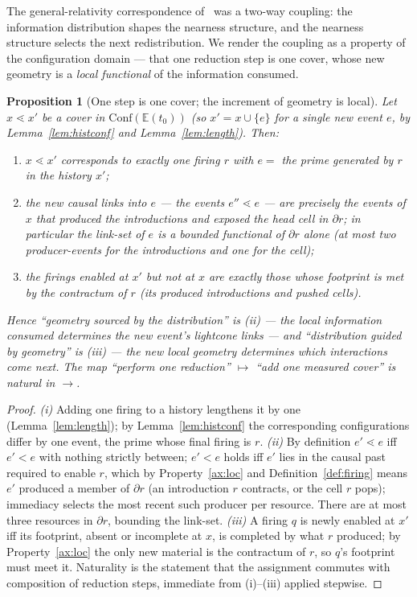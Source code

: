\documentclass[11pt]{article}
\theoremstyle{definition}
\theoremstyle{plain}
\newtheorem{proposition}[definition]{Proposition}
\newcommand{\red}{\longrightarrow}
\newcommand{\foot}{\partial}                       %
\newcommand{\Conf}{\mathrm{Conf}}
\newcommand{\Ev}{\mathbb{E}}
\newcommand{\lc}{\lessdot}                          %
\theoremstyle{remark}
\begin{document}
The general-relativity correspondence of~\cite{CostNote} was a two-way
coupling: the information distribution shapes the nearness structure, and
the nearness structure selects the next redistribution. We render the
coupling as a property of the configuration domain --- that one reduction
step is one cover, whose new geometry is a \emph{local functional} of the
information consumed.

\begin{proposition}[One step is one cover; the increment of geometry is local]
\label{prop:naturality}
Let $x \lc x'$ be a cover in $\Conf(\Ev(t_0))$ (so $x' = x \cup \{e\}$
for a single new event $e$, by Lemma~\ref{lem:histconf} and
Lemma~\ref{lem:length}). Then:
\begin{enumerate}[label=\textup{(\roman*)},leftmargin=2.2em,itemsep=1pt]
  \item $x \lc x'$ corresponds to exactly one firing $r$ with $e = $ the
  prime generated by $r$ in the history $x'$;
  \item the new causal links into $e$ --- the events $e'' \lc e$ ---
  are precisely the events of $x$ that produced the introductions and
  exposed the head cell in $\foot r$; in particular the link-set of $e$
  is a bounded functional of $\foot r$ alone (at most two
  producer-events for the introductions and one for the cell);
  \item the firings enabled at $x'$ but not at $x$ are exactly those
  whose footprint is met by the contractum of $r$ (its produced
  introductions and pushed cells).
\end{enumerate}
Hence ``geometry sourced by the distribution'' is \textup{(ii)} --- the
local information consumed determines the new event's lightcone links ---
and ``distribution guided by geometry'' is \textup{(iii)} --- the new
local geometry determines which interactions come next. The map ``perform
one reduction'' $\mapsto$ ``add one measured cover'' is natural in $\red$.
\end{proposition}

\begin{proof}
\emph{(i)} Adding one firing to a history lengthens it by one
(Lemma~\ref{lem:length}); by Lemma~\ref{lem:histconf} the corresponding
configurations differ by one event, the prime whose final firing is $r$.
\emph{(ii)} By definition $e' \lc e$ iff $e' < e$ with nothing strictly
between; $e' < e$ holds iff $e'$ lies in the causal past required to
enable $r$, which by Property~\ref{ax:loc} and
Definition~\ref{def:firing} means $e'$ produced a member of $\foot r$
(an introduction $r$ contracts, or the cell $r$ pops); immediacy selects
the most recent such producer per resource. There are at most three
resources in $\foot r$, bounding the link-set. \emph{(iii)} A firing $q$
is newly enabled at $x'$ iff its footprint, absent or incomplete at $x$,
is completed by what $r$ produced; by Property~\ref{ax:loc} the only
new material is the contractum of $r$, so $q$'s footprint must meet it.
Naturality is the statement that the assignment commutes with composition
of reduction steps, immediate from (i)--(iii) applied stepwise.
\end{proof}
\end{document}

